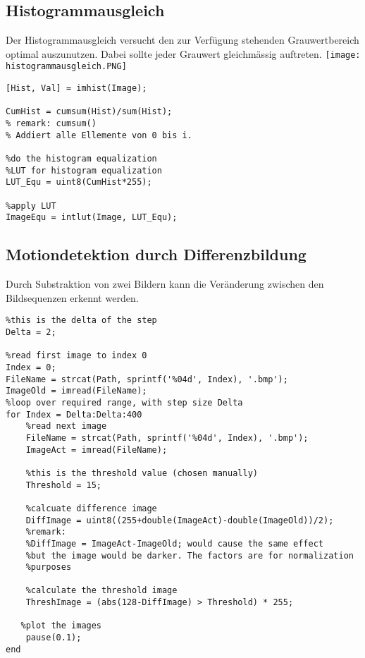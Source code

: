 \subsection{Histogrammausgleich}
Der Histogrammausgleich versucht den zur Verfügung stehenden Grauwertbereich optimal auszunutzen. Dabei sollte jeder Grauwert gleichmässig auftreten.
\texttt{[image: histogrammausgleich.PNG]}
\begin{lstlisting}
[Hist, Val] = imhist(Image);

CumHist = cumsum(Hist)/sum(Hist);
% remark: cumsum()
% Addiert alle Ellemente von 0 bis i.

%do the histogram equalization
%LUT for histogram equalization
LUT_Equ = uint8(CumHist*255);

%apply LUT
ImageEqu = intlut(Image, LUT_Equ);
\end{lstlisting}

\subsection{Motiondetektion durch Differenzbildung}
Durch Substraktion von zwei Bildern kann die Veränderung zwischen den Bildsequenzen erkennt werden.
\begin{lstlisting}
%this is the delta of the step
Delta = 2;

%read first image to index 0
Index = 0;
FileName = strcat(Path, sprintf('%04d', Index), '.bmp');
ImageOld = imread(FileName);
%loop over required range, with step size Delta
for Index = Delta:Delta:400
    %read next image
    FileName = strcat(Path, sprintf('%04d', Index), '.bmp');
    ImageAct = imread(FileName);
    
    %this is the threshold value (chosen manually)
    Threshold = 15;
    
    %calcuate difference image
    DiffImage = uint8((255+double(ImageAct)-double(ImageOld))/2);
    %remark:
    %DiffImage = ImageAct-ImageOld; would cause the same effect
    %but the image would be darker. The factors are for normalization
    %purposes

    %calculate the threshold image
    ThreshImage = (abs(128-DiffImage) > Threshold) * 255;
    
   %plot the images
    pause(0.1);
end
\end{lstlisting}
